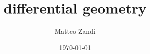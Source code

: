 \documentclass[a4paper, 12pt, openany]{memoir}
\title{differential geometry}
\author{Matteo Zandi}
\date{\today}
\begin{document}
\frontmatter



\tableofcontents

\mainmatter



\backmatter

\listoftheorems

\clearpage
{}
\printbibliography
\end{document}
